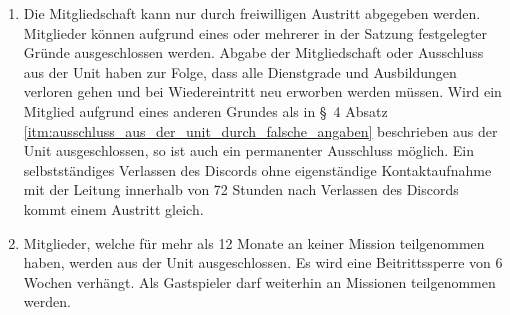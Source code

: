 \begin{enumerate}[label=(\arabic*)]
\begin{enumerate}[label=(\Alph*)]
        \item Schafft es ein Mitglied auf Probe nicht, innerhalb von 3 Monaten alle Voraussetzungen zur Beförderung in den Dienstgrad Gefreiter zu erfüllen, wird dieses aus der Unit ausgeschlossen. Es wird eine Beitrittssperre von 6 Wochen verhängt. Als Gastspieler darf weiterhin an Missionen teilgenommen werden.
    \end{enumerate}
    \item Die Mitgliedschaft kann nur durch freiwilligen Austritt abgegeben werden. Mitglieder können aufgrund eines oder mehrerer in der Satzung festgelegter Gründe ausgeschlossen werden. Abgabe der Mitgliedschaft oder Ausschluss aus der Unit haben zur Folge, dass alle Dienstgrade und Ausbildungen verloren gehen und bei Wiedereintritt neu erworben werden müssen. Wird ein Mitglied aufgrund eines anderen Grundes als in \S~4 Absatz \ref{itm:ausschluss_aus_der_unit_durch_falsche_angaben} beschrieben aus der Unit ausgeschlossen, so ist auch ein permanenter Ausschluss möglich. Ein selbstständiges Verlassen des Discords ohne eigenständige Kontaktaufnahme mit der Leitung innerhalb von 72 Stunden nach Verlassen des Discords kommt einem Austritt gleich.
    \item Mitglieder, welche für mehr als 12 Monate an keiner Mission teilgenommen haben, werden aus der Unit ausgeschlossen. Es wird eine Beitrittssperre von 6 Wochen verhängt. Als Gastspieler darf weiterhin an Missionen teilgenommen werden.
\end{enumerate}